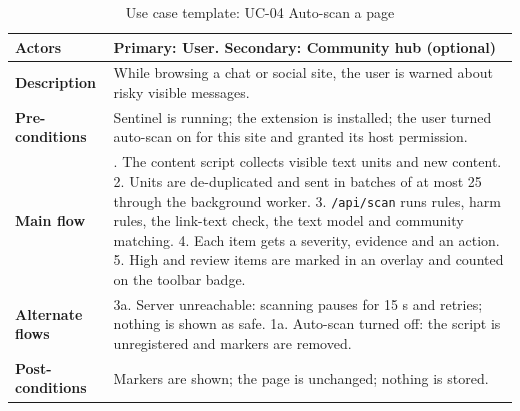 \begin{table}[H]
\centering
\footnotesize
\renewcommand{\arraystretch}{1.2}
\caption{Use case template: UC-04 Auto-scan a page}
\label{tab:uc4}
\begin{tabular}{|>{\raggedright\arraybackslash}p{2.9cm}|>{\raggedright\arraybackslash}p{12.0cm}|}
\hline
\textbf{Actors} & Primary: User. Secondary: Community hub (optional) \\ \hline
\textbf{Description} & While browsing a chat or social site, the user is warned about risky visible messages. \\ \hline
\textbf{Pre-conditions} & Sentinel is running; the extension is installed; the user turned auto-scan on for this site and granted its host permission. \\ \hline
\textbf{Main flow} & 1. The content script collects visible text units and new content. 2. Units are de-duplicated and sent in batches of at most 25 through the background worker. 3. \texttt{/api/scan} runs rules, harm rules, the link-text check, the text model and community matching. 4. Each item gets a severity, evidence and an action. 5. High and review items are marked in an overlay and counted on the toolbar badge. \\ \hline
\textbf{Alternate flows} & 3a. Server unreachable: scanning pauses for 15 s and retries; nothing is shown as safe. 1a. Auto-scan turned off: the script is unregistered and markers are removed. \\ \hline
\textbf{Post-conditions} & Markers are shown; the page is unchanged; nothing is stored. \\ \hline
\end{tabular}
\end{table}


